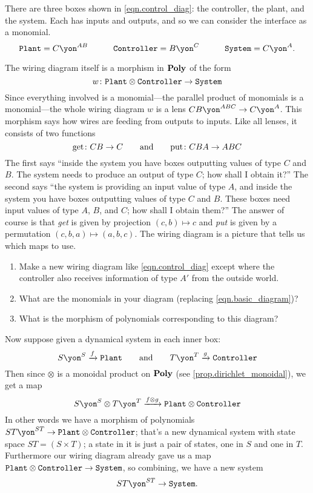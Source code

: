 \documentclass[Book-Poly]{subfiles}
\begin{document}
There are three boxes shown in \eqref{eqn.control_diag}: the controller, the plant, and the system. Each has inputs and outputs, and so we can consider the interface as a monomial.
\begin{equation}\label{eqn.basic_diagram}
	\const{Plant}=C\yon^{AB}
	\qquad\quad
	\const{Controller} = B\yon^C
	\qquad\quad
	\const{System} = C\yon^A.
\end{equation}

The wiring diagram itself is a morphism in $\textbf{Poly}$ of the form
\[
	w\colon\mathtt{Plant}\otimes\mathtt{Controller}\to\mathtt{System}
\]
Since everything involved is a monomial---the parallel product of monomials is a monomial---the whole wiring diagram $w$ is a lens $CB\yon^{ABC}\to C\yon^A$. This morphism says how wires are feeding from outputs to inputs. Like all lenses, it consists of two functions
\[
  \text{get}\colon CB\to C
  \qquad\text{and}\qquad
  \text{put}\colon CBA\to ABC
\]
The first says ``inside the system you have boxes outputting values of type $C$ and $B$. The system needs to produce an output of type $C$; how shall I obtain it?'' The second says ``the system is providing an input value of type $A$, and inside the system you have boxes outputting values of type $C$ and $B$. These boxes need input values of type $A$, $B$, and $C$; how shall I obtain them?'' The answer of course is that \emph{get} is given by projection $(c,b)\mapsto c$ and \emph{put} is given by a permutation $(c,b,a)\mapsto (a,b,c)$. The wiring diagram is a picture that tells us which maps to use.

\begin{exercise}
\begin{enumerate}
	\item Make a new wiring diagram like \eqref{eqn.control_diag} except where the controller also receives information of type $A'$ from the outside world.
	\item What are the monomials in your diagram (replacing \eqref{eqn.basic_diagram})?
	\item What is the morphism of polynomials corresponding to this diagram?
\qedhere
\end{enumerate}
\end{exercise}

Now suppose given a dynamical system in each inner box:
\[
S\yon^S\To{f}\const{Plant}
\qqand
T\yon^T\To{g}\const{Controller}
\]
Then since $\otimes$ is a monoidal product on $\textbf{Poly}$ (see \cref{prop.dirichlet_monoidal}), we get a map
\[
S\yon^S\otimes T\yon^T\To{f\otimes g}\const{Plant}\otimes\const{Controller}
\]
In other words we have a morphism of polynomials $ST\yon^{ST}\to \const{Plant}\otimes\const{Controller}$; that's a new dynamical system with state space $ST=(S\times T)$; a state in it is just a pair of states, one in $S$ and one in $T$. Furthermore our wiring diagram already gave us a map $\mathtt{Plant}\otimes\mathtt{Controller}\to\mathtt{System}$, so combining, we have a new system
\[
ST\yon^{ST}\to\const{System}.
\]
\end{document}
